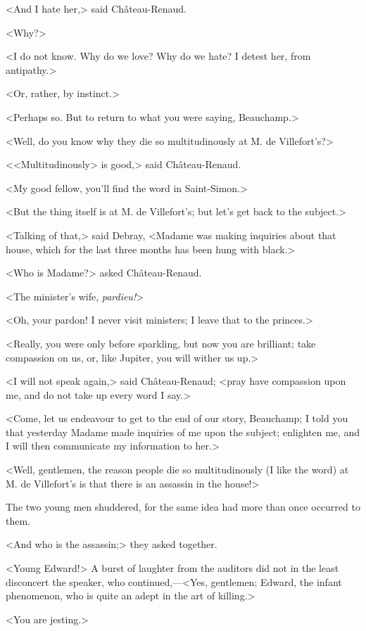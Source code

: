  <And I hate her,> said Château-Renaud. 

 <Why?> 

 <I do not know. Why do we love? Why do we hate? I detest her, from antipathy.> 

 <Or, rather, by instinct.> 

 <Perhaps so. But to return to what you were saying, Beauchamp.> 

 <Well, do you know why they die so multitudinously at M. de Villefort's?> 

 <<Multitudinously> is good,> said Château-Renaud. 

 <My good fellow, you'll find the word in Saint-Simon.> 

 <But the thing itself is at M. de Villefort's; but let's get back to the subject.> 

 <Talking of that,> said Debray, <Madame was making inquiries about that house, which for the last three months has been hung with black.> 

 <Who is Madame?> asked Château-Renaud. 

 <The minister's wife, \textit{pardieu!}> 

 <Oh, your pardon! I never visit ministers; I leave that to the princes.> 

 <Really, you were only before sparkling, but now you are brilliant; take compassion on us, or, like Jupiter, you will wither us up.> 

 <I will not speak again,> said Château-Renaud; <pray have compassion upon me, and do not take up every word I say.> 

 <Come, let us endeavour to get to the end of our story, Beauchamp; I told you that yesterday Madame made inquiries of me upon the subject; enlighten me, and I will then communicate my information to her.> 

 <Well, gentlemen, the reason people die so multitudinously (I like the word) at M. de Villefort's is that there is an assassin in the house!> 

 The two young men shuddered, for the same idea had more than once occurred to them. 

 <And who is the assassin;> they asked together. 

 <Young Edward!> A burst of laughter from the auditors did not in the least disconcert the speaker, who continued,—<Yes, gentlemen; Edward, the infant phenomenon, who is quite an adept in the art of killing.> 

 <You are jesting.> 

